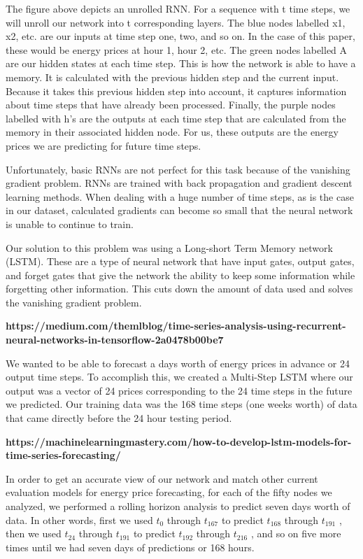 \documentclass[sigconf]{acmart}
\begin{document}
The figure above depicts an unrolled RNN. For a sequence with t time steps, we will unroll our network into t corresponding layers. The blue nodes labelled x1,  x2, etc. are our inputs at time step one, two, and so on. In the case of this paper, these would be energy prices at hour 1, hour 2, etc. The green nodes labelled A are our hidden states at each time step. This is how the network is able to have a memory. It is calculated with the previous hidden step and the current input. Because it takes this previous hidden step into account, it captures information about time steps that have already been processed. Finally, the purple nodes labelled with h’s are the outputs at each time step that are calculated from the memory in their associated hidden node. For us, these outputs are the energy prices we are predicting for future time steps. 

Unfortunately, basic RNNs are not perfect for this task because of the vanishing gradient problem. RNNs are trained with back propagation and gradient descent learning methods. When dealing with a huge number of time steps, as is the case in our dataset, calculated gradients can become so small that the neural network is unable to continue to train. 

Our solution to this problem was using a Long-short Term Memory network (LSTM). These are a type of neural network that have input gates, output gates, and forget gates that give the network the ability to keep some information while forgetting other information. This cuts down the amount of data used and solves the vanishing gradient problem. 

\textbf{https://medium.com/themlblog/time-series-analysis-using-recurrent-neural-networks-in-tensorflow-2a0478b00be7}

We wanted to be able to forecast a days worth of energy prices in advance or 24 output time steps. To accomplish this, we created a Multi-Step LSTM where our output was a vector of 24 prices corresponding to the 24 time steps in the future we predicted. Our training data was the 168 time steps (one weeks worth) of data that came directly before the 24 hour testing period.

\textbf{https://machinelearningmastery.com/how-to-develop-lstm-models-for-time-series-forecasting/}

In order to get an accurate view of our network and match other current evaluation models for energy price forecasting, for each of the fifty nodes we analyzed, we performed a rolling horizon analysis to predict seven days worth of data. In other words, first we used $t_{0}$ through $t_{167}$ to predict $t_{168}$ through $t_{191}$ , then we used $t_{24}$ through $t_{191}$ to predict $t_{192}$ through $t_{216}$ , and so on five more times until we had seven days of predictions or 168 hours.  
\end{document}
